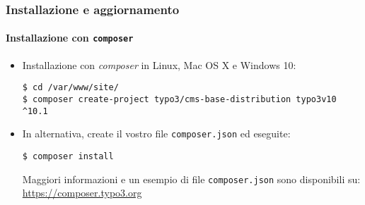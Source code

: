 
\begin{frame}[fragile]
	\frametitle{Installazione e aggiornamento}
	\framesubtitle{Installazione con \texttt{composer}}

	\begin{itemize}
		\item Installazione con \textit{composer} in Linux, Mac OS X e Windows 10:

			\begin{lstlisting}
$ cd /var/www/site/
$ composer create-project typo3/cms-base-distribution typo3v10 ^10.1
			\end{lstlisting}

		\item In alternativa, create il vostro file \texttt{composer.json} ed eseguite:

			\begin{lstlisting}
$ composer install
			\end{lstlisting}

			Maggiori informazioni e un esempio di file \texttt{composer.json} sono disponibili su:\newline
			\smaller
				\href{https://composer.typo3.org}{https://composer.typo3.org}
			\normalsize

	\end{itemize}
\end{frame}

